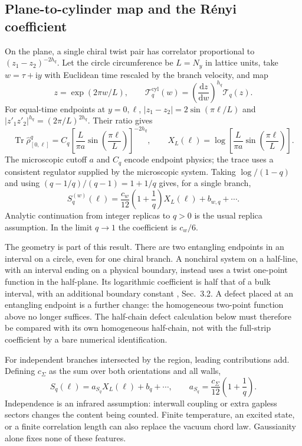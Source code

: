 \documentclass[aps,prb,onecolumn,nofootinbib,superscriptaddress]{revtex4-2}
\newcommand{\Tr}{\operatorname{Tr}}
\newcommand{\dd}{\mathrm{d}}
\newcommand{\ii}{\mathrm{i}}
\begin{document}
\subsection{Plane-to-cylinder map and the R\'enyi coefficient}
On the plane, a single chiral twist pair has correlator proportional to
$(z_1-z_2)^{-2h_q}$. Let the circle circumference be $L=N_y$ in lattice
units, take $w=\tau+\ii y$ with Euclidean time rescaled by the branch
velocity, and map
\begin{equation}
 z=\exp(2\pi w/L),\qquad
 \mathcal T_q^{\mathrm{cyl}}(w)
 =\left(\frac{\dd z}{\dd w}\right)^{h_q}\mathcal T_q(z).
 \label{eq:cylinder-map}
\end{equation}
For equal-time endpoints at $y=0,\ell$,
$|z_1-z_2|=2\sin(\pi\ell/L)$ and
$|z'_1z'_2|^{h_q}=(2\pi/L)^{2h_q}$. Their ratio gives
\begin{equation}
 \Tr\hat\rho_{[0,\ell]}^q
 =C_q\left[\frac{L}{\pi a}\sin\left(\frac{\pi\ell}{L}\right)\right]^{-2h_q},
 \qquad
 X_L(\ell)=\log\left[\frac{L}{\pi a}
                          \sin\left(\frac{\pi\ell}{L}\right)\right].
 \label{eq:replica-cylinder}
\end{equation}
The microscopic cutoff $a$ and $C_q$ encode endpoint physics; the trace
uses a consistent regulator supplied by the microscopic system.
Taking $\log/(1-q)$ and using
$(q-1/q)/(q-1)=1+1/q$ gives, for a single branch,
\begin{equation}
 S_q^{(w)}(\ell)=\frac{c_w}{12}\left(1+\frac1q\right)X_L(\ell)
 +b_{w,q}+\cdots .
 \label{eq:one-branch-renyi}
\end{equation}
Analytic continuation from integer replicas to $q>0$ is the usual replica
assumption. In the limit $q\to1$ the coefficient is $c_w/6$.

The geometry is part of this result. There are two entangling endpoints
in an interval on a circle, even for one chiral branch. A nonchiral system
on a half-line, with an interval ending on a physical boundary, instead
uses a twist one-point function in the half-plane. Its logarithmic
coefficient is half that of a bulk interval, with an additional boundary
constant \cite{CalabreseCardy2009}, Sec.~3.2. A defect placed at an
entangling endpoint is a further change: the homogeneous two-point
function above no longer suffices. The half-chain defect calculation
below must therefore be compared with its own homogeneous half-chain,
not with the full-strip coefficient by a bare numerical identification.

For independent branches intersected by the region, leading contributions
add. Defining $c_\Sigma$ as the sum over both orientations and all walls,
\begin{equation}
 S_q(\ell)=a_{S_q}X_L(\ell)+b_q+\cdots,\qquad
 a_{S_q}=\frac{c_\Sigma}{12}\left(1+\frac1q\right).
 \label{eq:renyi-slope}
\end{equation}
Independence is an infrared assumption: interwall coupling or extra
gapless sectors changes the content being counted. Finite temperature,
an excited state, or a finite correlation length can also replace the
vacuum chord law. Gaussianity alone fixes none of these features.
\end{document}
